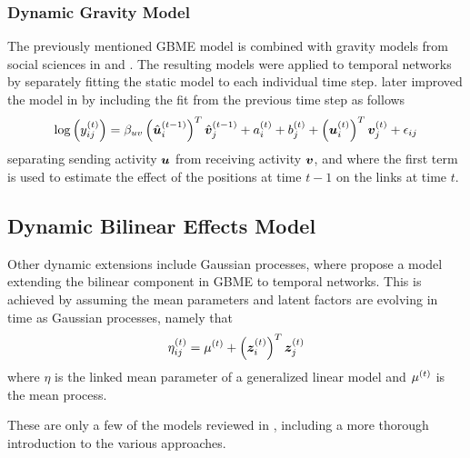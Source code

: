     \subsubsection{Dynamic Gravity Model}
    
        The previously mentioned GBME model is combined with gravity models from social sciences in \citeauthor{ward2007commerce} \cite{ward2007commerce} and \citeauthor{ward2007peace} \cite{ward2007peace}. The resulting models were applied to temporal networks by separately fitting the static model to each individual time step. \citeauthor{ward2013gravity} later improved the model in \cite{ward2013gravity} by including the fit from the previous time step as follows
        \begin{equation}
            \log\left(\sub(y)^\t\right) = \beta_{uv} \left(\hat{\u}_i^{(t-1)}\right)^T \hat{\v}_j^{(t-1)} + a_i^\t + b_j^\t + \left(\u_i^\t\right)^T \v_j^\t + \sub(\epsilon)
        \end{equation}
        separating sending activity $\bm{u}$ from receiving activity $\bm{v}$, and where the first term is used to estimate the effect of the positions at time $t-1$ on the links at time $t$.
        
    \subsection{Dynamic Bilinear Effects Model}
    
        Other dynamic extensions include Gaussian processes, where \citeauthor{durante2014bayesian} \cite{durante2014bayesian,durante2014nonparametric} propose a model extending the bilinear component in GBME to temporal networks. This is achieved by assuming the mean parameters and latent factors are evolving in time as Gaussian processes, namely that
        \begin{equation}
            \sub(\eta)^\t = \mu^\t + \left(\z_i^\t\right)^T \z_j^\t
        \end{equation}
        where $\eta$ is the linked mean parameter of a generalized linear model and $\mu^{(t)}$ is the mean process.
        
        These are only a few of the models reviewed in \cite{kim2018review}, including a more thorough introduction to the various approaches.
    



